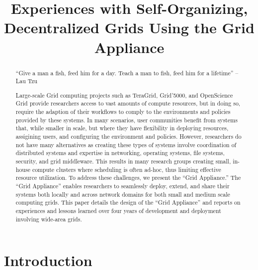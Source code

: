 \documentclass[conference]{IEEEtran}
\begin{document}
\title{Experiences with Self-Organizing, Decentralized Grids Using the Grid
Appliance}

\author{
}

\maketitle


\begin{abstract}

``Give a man a fish, feed him for a day.  Teach a man to fish, feed him for a
lifetime'' -- Lau Tzu

Large-scale Grid computing projects such as TeraGrid, Grid'5000, and
OpenScience Grid provide researchers access to vast amounts of compute
resources, but in doing so, require the adaption of their workflows to comply
to the environments and policies provided by these systems.  In many scenarios,
user communities benefit from systems that, while smaller in scale, but where
they have flexibility in deploying resources, assigining users, and configuring
the environment and policies. However, researchers do not have many
alternatives as creating these types of systems involve coordination of
distributed systems and expertise in networking, operating systems, file
systems, security, and grid middleware.  This results in many research groups
creating small, in-house compute clusters where scheduling is often ad-hoc,
thus limiting effective resource utilization.  To address these challenges, we
present the ``Grid Appliance.''  The ``Grid Appliance'' enables researchers to
seamlessly deploy, extend, and share their systems both locally and across
network domains for both small and medium scale computing grids.  This paper
details the design of the ``Grid Appliance'' and reports on experiences and
lessons learned over four years of development and deployment involving
wide-area grids.

\end{abstract}

\section{Introduction}
\end{document}
